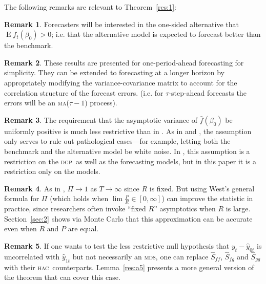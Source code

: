 \documentclass[11pt,fleqn]{article}
\theoremstyle{definition}
\newtheorem{rem}{Remark}
\DeclareMathOperator{\E}{E}
\newcommand{\dgp}{\textsc{dgp}}
\newcommand{\hac}{\textsc{hac}}
\newcommand{\ma}{\textsc{ma}}
\newcommand{\mds}{\textsc{mds}}
\begin{document}
The following remarks are relevant to Theorem~\ref{res:1}:

\begin{rem}
  Forecasters will be interested in the one-sided alternative that $\E
  f_t(\beta_0) > 0$; i.e. that the alternative model is expected to
  forecast better than the benchmark.
\end{rem}

\begin{rem}
  These results are presented for one-period-ahead forecasting for
  simplicity.  They can be extended to forecasting at a longer horizon
  by appropriately modifying the variance-covariance matrix to account
  for the correlation structure of the forecast errors. (i.e. for
  $\tau$-step-ahead forecasts the errors will be an \ma($\tau-1$) process).
\end{rem}

\begin{rem}
  The requirement that the asymptotic variance of $\bar f(\beta_0)$ be
  uniformly positive is much less restrictive than in \cite{Wes:96}.
  As in \cite{GiW:06} and \citet{ClW:06,ClW:07}, the assumption only
  serves to rule out pathological cases---for example, letting both
  the benchmark and the alternative model be white noise. In
  \citet{Wes:96}, this assumption is a restriction on the \dgp\ as
  well as the forecasting models, but in this paper it is a
  restriction only on the models.
\end{rem}

\begin{rem}
  As in \citet{Wes:96}, $\Pi \to 1$ as $T \to \infty$ since $R$ is
  fixed.  But using West's general formula for $\Pi$ (which holds when
  $\lim \tfrac{P}{R} \in [0,\infty]$) can improve the statistic in practice,
  since researchers often invoke ``fixed $R$'' asymptotics when $R$ is
  large.  Section~\ref{sec:2} shows via Monte Carlo that this
  approximation can be accurate even when $R$ and $P$ are equal.
\end{rem}

\begin{rem}
  If one wants to test the less restrictive null hypothesis that
  $y_{t} - \hat{y}_{0t}$ is uncorrelated with $\hat{y}_{1t}$ but not
  necessarily an \mds, one can replace $\hat{S}_{ff}$, $\hat{S}_{fg}$
  and $\hat{S}_{gg}$ with their \hac\ counterparts.
  Lemma~\ref{res:a5} presents a more general version of the theorem
  that can cover this case.
\end{rem}
\end{document}
